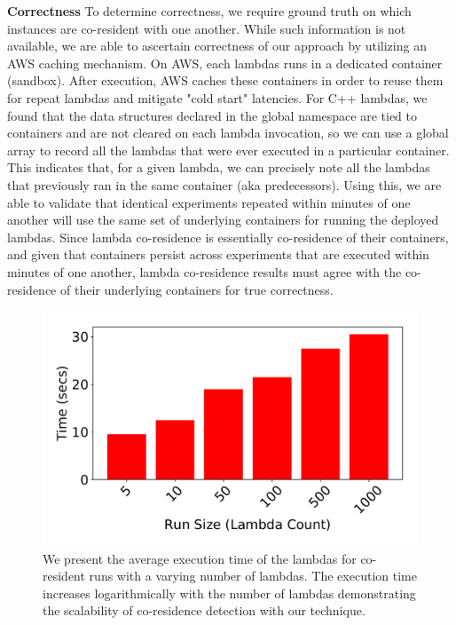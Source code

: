 \textbf{Correctness} 
To determine correctness, we require ground truth on which instances are
co-resident with one another. While such information is not available, we are
able to ascertain correctness of our approach by utilizing an AWS caching
mechanism. On AWS, each lambdas runs in a dedicated container (sandbox).  After
execution, AWS caches these containers in order to reuse
them~\cite{awscontainerreuse} for repeat lambdas and mitigate "cold start"
latencies. For C++ lambdas, we found that the data structures declared in the
global namespace are tied to containers and are not cleared on each lambda
invocation, so we can use a global array to record all the lambdas that were
ever executed in a particular container. This indicates that, for a given
lambda, we can precisely note all the lambdas that previously ran in the same
container (aka predecessors).  Using this, we are able to validate that
identical experiments repeated within minutes of one another will use the same
set of underlying containers for running the deployed lambdas. Since lambda
co-residence is essentially co-residence of their containers, and given that
containers persist across experiments that are executed within minutes of one
another, lambda co-residence results must agree with the co-residence of their
underlying containers for true correctness.


\begin{figure}[!t]
  \includegraphics[width=.99\linewidth]{fig/runtimes.pdf}
  \caption{We present the average execution time of the lambdas for co-resident
  runs with a varying number of lambdas. The execution time increases
  logarithmically with the number of lambdas demonstrating the scalability of
  co-residence detection with our technique.
\label{fig:runtimes}}
\end{figure}


